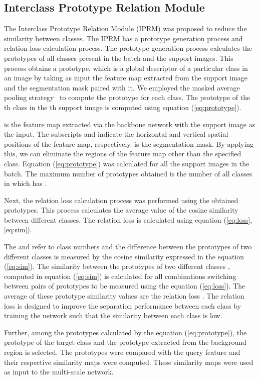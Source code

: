 \documentclass[runningheads]{llncs}
\begin{document}
\subsection{Interclass Prototype Relation Module}
The Interclass Prototype Relation Module (IPRM) was proposed to reduce the similarity between classes. The IPRM has a prototype generation process and relation loss calculation process.
The prototype generation process calculates the prototypes of all classes present in the batch and the support images.
This process obtains a prototype, which is a global descriptor of a particular class in an image by taking as input the feature map extracted from the support image and the segmentation mask paired with it.
We employed the masked average pooling strategy~\cite{AMP} to compute the prototype for each class. The prototype  of the  th class in the  th support image is computed using equation (\ref{eq:prototype}).

 is the feature map extracted via the backbone network with the support image  as the input.
The subscripts  and  indicate the horizontal and vertical spatial positions of the feature map, respectively.
 is the segmentation mask. By applying this, we can eliminate the regions of the feature map other than the specified class.
Equation (\ref{eq:prototype}) was calculated for all the support images in the batch. The maximum number of prototypes  obtained is the number of all classes in which  has .


Next, the relation loss calculation process was performed using the obtained prototypes.
This process calculates the average value  of the cosine similarity between different classes.
The relation loss  is calculated using equation (\ref{eq:loss},\ref{eq:sim}).



The  and  refer to class numbers and the difference between the prototypes of two different classes is measured by the cosine similarity expressed in the equation (\ref{eq:sim}).
The similarity between the prototypes of two different classes , computed in equation (\ref{eq:sim}) is calculated for all combinations switching between pairs of prototypes to be measured using the equation (\ref{eq:loss}).
The average of these prototype similarity values are the relation loss .
The relation loss  is designed to improve the separation performance between each class by training the network such that the similarity between each class is low.

Further, among the prototypes calculated by the equation (\ref{eq:prototype}), the prototype of the target class and the prototype extracted from the background region is selected.
The prototypes were compared with the query feature and their respective similarity maps were computed. These similarity maps were used as input to the multi-scale network.
\end{document}
